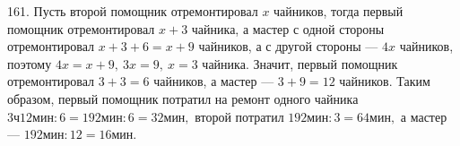 161. Пусть второй помощник отремонтировал $x$ чайников, тогда первый помощник отремонтировал $x+3$ чайника, а мастер с одной стороны отремонтировал $x+3+6=x+9$ чайников, а с другой стороны --- $4x$ чайников, поэтому $4x=x+9,\ 3x=9,\ x=3$ чайника. Значит, первый помощник отремонтировал $3+3=6$ чайников, а мастер --- $3+9=12$ чайников. Таким образом, первый помощник потратил на ремонт одного чайника $3\text{ч}12\text{мин}:6=192\text{мин}:6=32\text{мин},$ второй потратил $192\text{мин}:3=64\text{мин},$ а мастер --- $192\text{мин}:12=16\text{мин}.$\\
